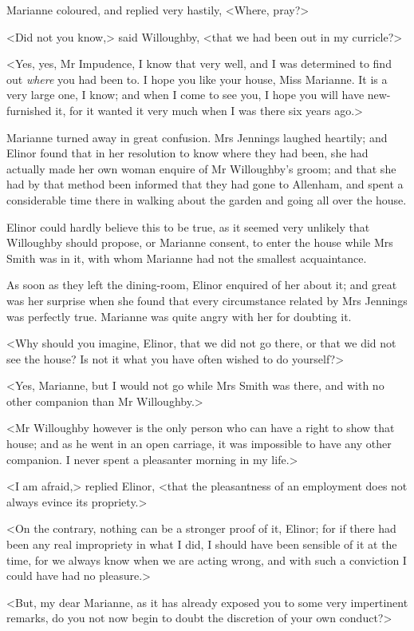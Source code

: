 Marianne coloured, and replied very hastily, <Where, pray?>

<Did not you know,> said Willoughby, <that we had been out in my curricle?>

<Yes, yes, Mr Impudence, I know that very well, and I was determined to find out \textit{where} you had been to. I hope you like your house, Miss Marianne. It is a very large one, I know; and when I come to see you, I hope you will have new-furnished it, for it wanted it very much when I was there six years ago.>

Marianne turned away in great confusion. Mrs Jennings laughed heartily; and Elinor found that in her resolution to know where they had been, she had actually made her own woman enquire of Mr Willoughby's groom; and that she had by that method been informed that they had gone to Allenham, and spent a considerable time there in walking about the garden and going all over the house.

Elinor could hardly believe this to be true, as it seemed very unlikely that Willoughby should propose, or Marianne consent, to enter the house while Mrs Smith was in it, with whom Marianne had not the smallest acquaintance.

As soon as they left the dining-room, Elinor enquired of her about it; and great was her surprise when she found that every circumstance related by Mrs Jennings was perfectly true. Marianne was quite angry with her for doubting it.

<Why should you imagine, Elinor, that we did not go there, or that we did not see the house? Is not it what you have often wished to do yourself?>

<Yes, Marianne, but I would not go while Mrs Smith was there, and with no other companion than Mr Willoughby.>

<Mr Willoughby however is the only person who can have a right to show that house; and as he went in an open carriage, it was impossible to have any other companion. I never spent a pleasanter morning in my life.>

<I am afraid,> replied Elinor, <that the pleasantness of an employment does not always evince its propriety.>

<On the contrary, nothing can be a stronger proof of it, Elinor; for if there had been any real impropriety in what I did, I should have been sensible of it at the time, for we always know when we are acting wrong, and with such a conviction I could have had no pleasure.>

<But, my dear Marianne, as it has already exposed you to some very impertinent remarks, do you not now begin to doubt the discretion of your own conduct?>

